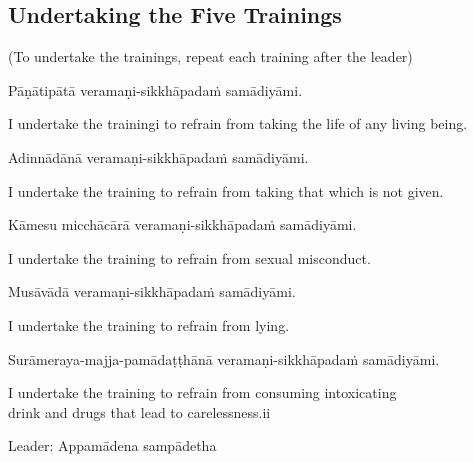 \subsection{Undertaking the Five Trainings}

\begin{center}
(To undertake the trainings, repeat each training after the leader)\\
\end{center}

Pāṇātipātā veramaṇi-sikkhāpadaṁ samādiyāmi.\\

\begin{english}
I undertake the trainingi to refrain from taking the life of any living being.\\
\end{english}

Adinnādānā veramaṇi-sikkhāpadaṁ samādiyāmi.\\

\begin{english}
I undertake the training to refrain from taking that which is not given.\\
\end{english}

Kāmesu micchācārā veramaṇi-sikkhāpadaṁ samādiyāmi.\\

\begin{english}
I undertake the training to refrain from sexual misconduct.\\
\end{english}

Musāvādā veramaṇi-sikkhāpadaṁ samādiyāmi.\\

\begin{english}
I undertake the training to refrain from lying.\\
\end{english}

Surāmeraya-majja-pamādaṭṭhānā veramaṇi-sikkhāpadaṁ samādiyāmi.\\

\begin{english}
I undertake the training to refrain from consuming intoxicating\\
drink and drugs that lead to carelessness.ii\\
\end{english}

Leader: Appamādena sampādetha\\

